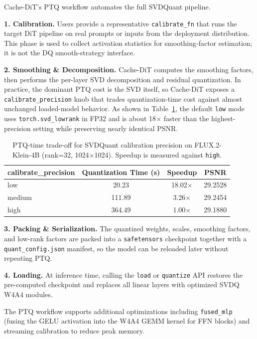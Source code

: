 \documentclass[10pt]{article}
\begin{document}
Cache-DiT's PTQ workflow automates the full SVDQuant pipeline.

\textbf{1. Calibration.} Users provide a representative \texttt{calibrate\_fn} that runs the target DiT pipeline on real prompts or inputs from the deployment distribution. This phase is used to collect activation statistics for smoothing-factor estimation; it is not the DQ smooth-strategy interface.

\textbf{2. Smoothing \& Decomposition.} Cache-DiT computes the smoothing factors, then performs the per-layer SVD decomposition and residual quantization. In practice, the dominant PTQ cost is the SVD itself, so Cache-DiT exposes a \texttt{calibrate\_precision} knob that trades quantization-time cost against almost unchanged loaded-model behavior. As shown in Table~\ref{tab:ptq_precision}, the default \texttt{low} mode uses \texttt{torch.svd\_lowrank} in FP32 and is about 18$\times$ faster than the highest-precision setting while preserving nearly identical PSNR.

\begin{table}[htbp]
\centering
\caption{PTQ-time trade-off for SVDQuant calibration precision on FLUX.2-Klein-4B (rank=32, 1024$\times$1024). Speedup is measured against \texttt{high}.}
\label{tab:ptq_precision}
{\small
\begin{tabular}{lccc}
\toprule
\textbf{calibrate\_precision} & \textbf{Quantization Time (s)} & \textbf{Speedup} & \textbf{PSNR} \\
\midrule
low & 20.23 & 18.02$\times$ & 29.2528 \\
medium & 111.89 & 3.26$\times$ & 29.2454 \\
high & 364.49 & 1.00$\times$ & 29.1880 \\
\bottomrule
\end{tabular}
}
\end{table}

\textbf{3. Packing \& Serialization.} The quantized weights, scales, smoothing factors, and low-rank factors are packed into a \texttt{safetensors} checkpoint together with a \texttt{quant\_config.json} manifest, so the model can be reloaded later without repeating PTQ.

\textbf{4. Loading.} At inference time, calling the \texttt{load} or \texttt{quantize} API restores the pre-computed checkpoint and replaces all linear layers with optimized SVDQ W4A4 modules.

The PTQ workflow supports additional optimizations including \texttt{fused\_mlp} (fusing the GELU activation into the W4A4 GEMM kernel for FFN blocks) and streaming calibration to reduce peak memory.
\end{document}
